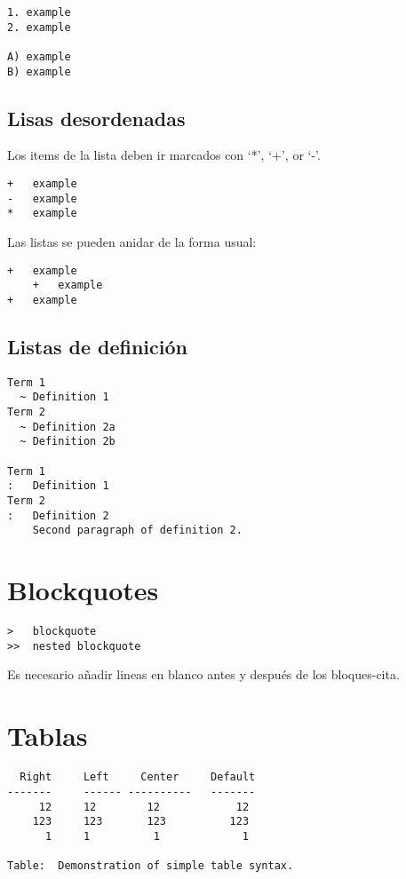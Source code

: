\documentclass[12pt,spanish,]{article}
\begin{document}
\begin{verbatim}
1. example
2. example

A) example
B) example
\end{verbatim}

\subsection{Lisas desordenadas}\label{lisas-desordenadas}

Los items de la lista deben ir marcados con `*', `+', or `-'.

\begin{verbatim}
+   example
-   example
*   example
\end{verbatim}

Las listas se pueden anidar de la forma usual:

\begin{verbatim}
+   example
    +   example
+   example
\end{verbatim}

\subsection{Listas de definición}\label{listas-de-definiciuxf3n}

\begin{verbatim}
Term 1
  ~ Definition 1
Term 2
  ~ Definition 2a
  ~ Definition 2b

Term 1
:   Definition 1
Term 2
:   Definition 2
    Second paragraph of definition 2.
\end{verbatim}

\section{Blockquotes}\label{blockquotes}

\begin{verbatim}
>   blockquote
>>  nested blockquote
\end{verbatim}

Es necesario añadir lineas en blanco antes y después de los
bloques-cita.

\section{Tablas}\label{tablas}

\begin{verbatim}
  Right     Left     Center     Default
-------     ------ ----------   -------
     12     12        12            12
    123     123       123          123
      1     1          1             1

Table:  Demonstration of simple table syntax.
\end{verbatim}
\end{document}
